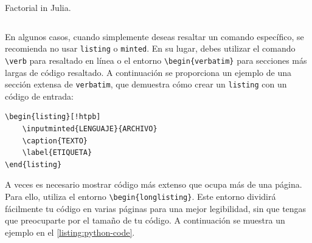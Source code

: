 \begin{listing}[!htpb]
\caption{Factorial in Julia.}
\label{listing:julia-code}
\inputminted{julia}{Code/Factorial.jl}
\end{listing}

En algunos casos, cuando simplemente deseas resaltar un comando específico, se recomienda no usar \verb|listing| o \verb|minted|. En su lugar, debes utilizar el comando \verb|\verb| para resaltado en línea o el entorno \verb|\begin{verbatim}| para secciones más largas de código resaltado. A continuación se proporciona un ejemplo de una sección extensa de \verb|verbatim|, que demuestra cómo crear un \verb|listing| con un código de entrada:

\begin{verbatim}
\begin{listing}[!htpb]
    \inputminted{LENGUAJE}{ARCHIVO}
    \caption{TEXTO}
    \label{ETIQUETA}
\end{listing}
\end{verbatim}

A veces es necesario mostrar código más extenso que ocupa más de una página. Para ello, utiliza el entorno \verb|\begin{longlisting}|. Este entorno dividirá fácilmente tu código en varias páginas para una mejor legibilidad, sin que tengas que preocuparte por el tamaño de tu código. A continuación se muestra un ejemplo en el \autoref{listing:python-code}.

